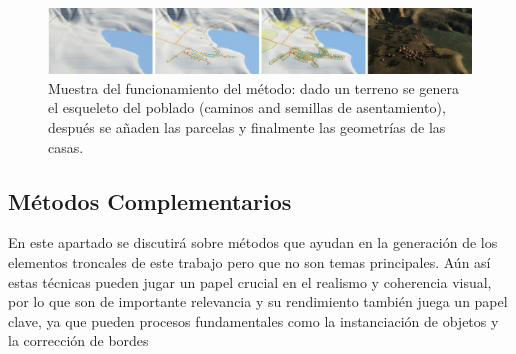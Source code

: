             \begin{figure}[h]
                \centering
                \includegraphics[width=1\textwidth]{img/procedural-generation-of-villages-on-arbitrary-terrains-overview.png}
                \caption{Muestra del funcionamiento del método: dado un terreno se genera el esqueleto del poblado (caminos and semillas de asentamiento), después se añaden las parcelas y finalmente las geometrías de las casas.}
            \end{figure}   



        \subsection{Métodos Complementarios}
        En este apartado se discutirá sobre métodos que ayudan en la generación de los elementos troncales de este trabajo pero que no son temas principales. Aún así estas técnicas pueden jugar un papel crucial en el realismo y coherencia visual, por lo que son de importante relevancia y su rendimiento también juega un papel clave, ya que pueden  procesos fundamentales como la instanciación de objetos y la corrección de bordes
